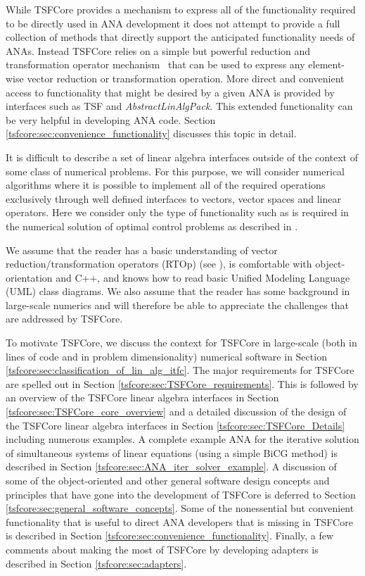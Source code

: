 While TSFCore provides a mechanism to express all of the functionality
required to be directly used in ANA development it does not attempt to
provide a full collection of methods that directly support the
anticipated functionality needs of ANAs.  Instead TSFCore relies on a
simple but powerful reduction and transformation operator
mechanism~\cite{ref:rtop_toms} that can be used to express any
element-wise vector reduction or transformation operation.  More
direct and convenient access to functionality that might be desired by
a given ANA is provided by interfaces such as TSF and
{}\textit{AbstractLinAlgPack}.  This extended functionality can be
very helpful in developing ANA code.  Section
{}\ref{tsfcore:sec:convenience_functionality} discusses this topic in
detail.

It is difficult to describe a set of linear algebra interfaces outside
of the context of some class of numerical problems.  For this purpose,
we will consider numerical algorithms where it is possible to
implement all of the required operations exclusively through well
defined interfaces to vectors, vector spaces and linear operators.
Here we consider only the type of functionality such as is required in
the numerical solution of optimal control problems as described in
{}\cite{ref:opt_ctrl_itfc}.

We assume that the reader has a basic understanding of vector
reduction/transformation operators (RTOp) (see
{}\cite{ref:rtop_toms}), is comfortable with object-orientation
{}\cite{ref:gama_et_al_1995} and C++, and knows how to read basic
Unified Modeling Language (UML) {}\cite{ref:uml_distilled_2nd_ed}
class diagrams.  We also assume that the reader has some background in
large-scale numerics and will therefore be able to appreciate the
challenges that are addressed by TSFCore.

To motivate TSFCore, we discuss the context for TSFCore in large-scale
(both in lines of code and in problem dimensionality) numerical
software in Section
{}\ref{tsfcore:sec:classification_of_lin_alg_itfc}.  The major
requirements for TSFCore are spelled out in Section
{}\ref{tsfcore:sec:TSFCore_requirements}.  This is followed by an
overview of the TSFCore linear algebra interfaces in Section
{}\ref{tsfcore:sec:TSFCore_core_overview} and a detailed discussion of
the design of the TSFCore linear algebra interfaces in Section
{}\ref{tsfcore:sec:TSFCore_Details} including numerous examples.  A
complete example ANA for the iterative solution of simultaneous
systems of linear equations (using a simple BiCG method) is described
in Section {}\ref{tsfcore:sec:ANA_iter_solver_example}.  A discussion
of some of the object-oriented and other general software design
concepts and principles that have gone into the development of TSFCore
is deferred to Section {}\ref{tsfcore:sec:general_software_concepts}.
Some of the nonessential but convenient functionality that is useful
to direct ANA developers that is missing in TSFCore is described in
Section {}\ref{tsfcore:sec:convenience_functionality}. Finally, a few
comments about making the most of TSFCore by developing adapters is
described in Section {}\ref{tsfcore:sec:adapters}.

